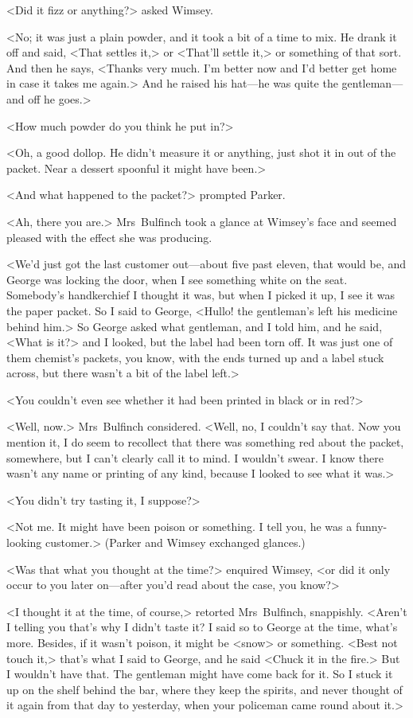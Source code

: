 <Did it fizz or anything?> asked Wimsey.

<No; it was just a plain powder, and it took a bit of a time to mix. He drank it off and said, <That settles it,> or <That'll settle it,> or something of that sort. And then he says, <Thanks very much. I'm better now and I'd better get home in case it takes me again.> And he raised his hat—he was quite the gentleman—and off he goes.>

<How much powder do you think he put in?>

<Oh, a good dollop. He didn't measure it or anything, just shot it in out of the packet. Near a dessert spoonful it might have been.>

<And what happened to the packet?> prompted Parker.

<Ah, there you are.> Mrs~Bulfinch took a glance at Wimsey's face and seemed pleased with the effect she was producing.

<We'd just got the last customer out—about five past eleven, that would be, and George was locking the door, when I see something white on the seat. Somebody's handkerchief I thought it was, but when I picked it up, I see it was the paper packet. So I said to George, <Hullo! the gentleman's left his medicine behind him.> So George asked what gentleman, and I told him, and he said, <What is it?> and I looked, but the label had been torn off. It was just one of them chemist's packets, you know, with the ends turned up and a label stuck across, but there wasn't a bit of the label left.>

<You couldn't even see whether it had been printed in black or in red?>

<Well, now.> Mrs~Bulfinch considered. <Well, no, I couldn't say that. Now you mention it, I do seem to recollect that there was something red about the packet, somewhere, but I can't clearly call it to mind. I wouldn't swear. I know there wasn't any name or printing of any kind, because I looked to see what it was.>

<You didn't try tasting it, I suppose?>

<Not me. It might have been poison or something. I tell you, he was a funny-looking customer.> (Parker and Wimsey exchanged glances.)

<Was that what you thought at the time?> enquired Wimsey, <or did it only occur to you later on—after you'd read about the case, you know?>

<I thought it at the time, of course,> retorted Mrs~Bulfinch, snappishly. <Aren't I telling you that's why I didn't taste it? I said so to George at the time, what's more. Besides, if it wasn't poison, it might be <snow> or something. <Best not touch it,> that's what I said to George, and he said <Chuck it in the fire.> But I wouldn't have that. The gentleman might have come back for it. So I stuck it up on the shelf behind the bar, where they keep the spirits, and never thought of it again from that day to yesterday, when your policeman came round about it.>

